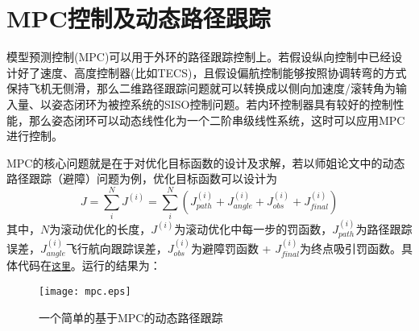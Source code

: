 \section{MPC控制及动态路径跟踪}
模型预测控制(MPC)可以用于外环的路径跟踪控制上。若假设纵向控制中已经设计好了速度、高度控制器(比如TECS)，且假设偏航控制能够按照协调转弯的方式保持飞机无侧滑，那么二维路径跟踪问题就可以转换成以侧向加速度/滚转角为输入量、以姿态闭环为被控系统的SISO控制问题。若内环控制器具有较好的控制性能，那么姿态闭环可以动态线性化为一个二阶串级线性系统，这时可以应用MPC进行控制。

MPC的核心问题就是在于对优化目标函数的设计及求解，若以师姐论文中的动态路径跟踪（避障）问题为例，优化目标函数可以设计为
\begin{equation*}
	J = \sum_i^N J^{(i)} = \sum_i^N \left(J_{path}^{(i)} + J_{angle}^{(i)} + J_{obs}^{(i)} + J_{final}^{(i)} \right)
\end{equation*}
其中，$N$为滚动优化的长度，$J^{(i)}$为滚动优化中每一步的罚函数，$J_{path}^{(i)}$为路径跟踪误差，$J_{angle}^{(i)}$飞行航向跟踪误差，$J_{obs}^{(i)}$为避障罚函数 + $J_{final}^{(i)}$为终点吸引罚函数。具体代码在\href{attachment/mympc.m}{\texttt{这里}}。运行的结果为：

\begin{figure}[htbp]
	\figskip 
	\centering
	\texttt{[image: mpc.eps]}	  
	\caption{\label{fig: mpc} 一个简单的基于MPC的动态路径跟踪}
\end{figure}



